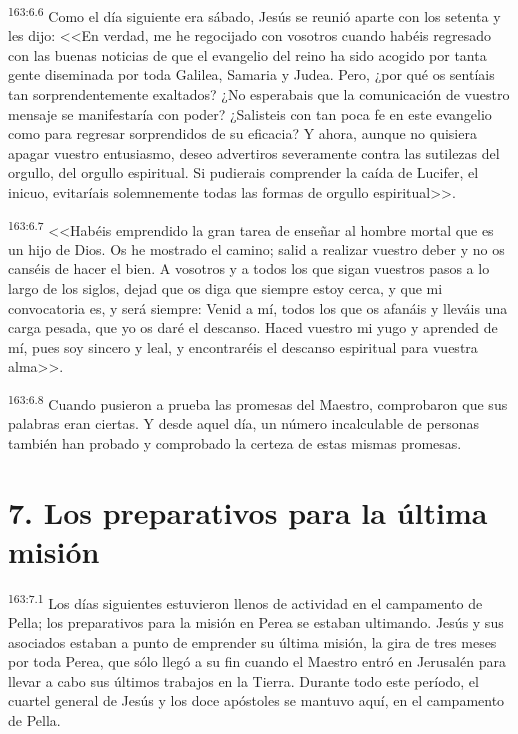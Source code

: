 \par 
\textsuperscript{163:6.6} Como el día siguiente era sábado, Jesús se reunió aparte con los setenta y les dijo: <<En verdad, me he regocijado con vosotros cuando habéis regresado con las buenas noticias de que el evangelio del reino ha sido acogido por tanta gente diseminada por toda Galilea, Samaria y Judea. Pero, ¿por qué os sentíais tan sorprendentemente exaltados? ¿No esperabais que la comunicación de vuestro mensaje se manifestaría con poder? ¿Salisteis con tan poca fe en este evangelio como para regresar sorprendidos de su eficacia? Y ahora, aunque no quisiera apagar vuestro entusiasmo, deseo advertiros severamente contra las sutilezas del orgullo, del orgullo espiritual. Si pudierais comprender la caída de Lucifer, el inicuo, evitaríais solemnemente todas las formas de orgullo espiritual>>.

\par 
\textsuperscript{163:6.7} <<Habéis emprendido la gran tarea de enseñar al hombre mortal que es un hijo de Dios. Os he mostrado el camino; salid a realizar vuestro deber y no os canséis de hacer el bien. A vosotros y a todos los que sigan vuestros pasos a lo largo de los siglos, dejad que os diga que siempre estoy cerca, y que mi convocatoria es, y será siempre: Venid a mí, todos los que os afanáis y lleváis una carga pesada, que yo os daré el descanso. Haced vuestro mi yugo y aprended de mí, pues soy sincero y leal, y encontraréis el descanso espiritual para vuestra alma>>.

\par 
\textsuperscript{163:6.8} Cuando pusieron a prueba las promesas del Maestro, comprobaron que sus palabras eran ciertas. Y desde aquel día, un número incalculable de personas también han probado y comprobado la certeza de estas mismas promesas.

\section*{7. Los preparativos para la última misión}
\par 
\textsuperscript{163:7.1} Los días siguientes estuvieron llenos de actividad en el campamento de Pella; los preparativos para la misión en Perea se estaban ultimando. Jesús y sus asociados estaban a punto de emprender su última misión, la gira de tres meses por toda Perea, que sólo llegó a su fin cuando el Maestro entró en Jerusalén para llevar a cabo sus últimos trabajos en la Tierra. Durante todo este período, el cuartel general de Jesús y los doce apóstoles se mantuvo aquí, en el campamento de Pella.

